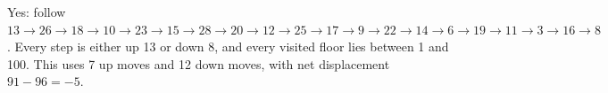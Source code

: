 Yes: follow $\boxed{13\to26\to18\to10\to23\to15\to28\to20\to12\to25\to17\to9\to22\to14\to6\to19\to11\to3\to16\to8}$. Every step is either up 13 or down 8, and every visited floor lies between 1 and 100. This uses 7 up moves and 12 down moves, with net displacement $91-96=-5$.
